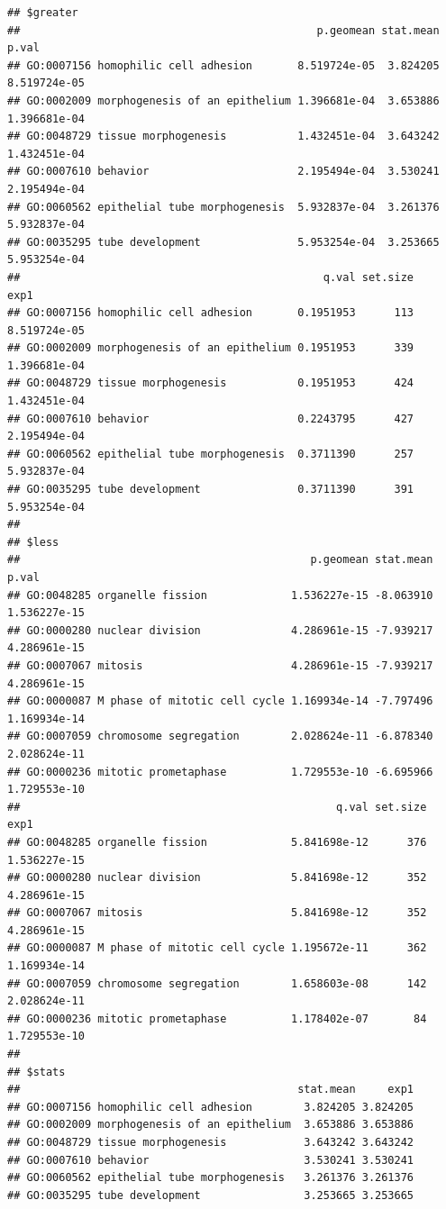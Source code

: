 \documentclass[
]{article}
\begin{document}
\begin{verbatim}
## $greater
##                                              p.geomean stat.mean        p.val
## GO:0007156 homophilic cell adhesion       8.519724e-05  3.824205 8.519724e-05
## GO:0002009 morphogenesis of an epithelium 1.396681e-04  3.653886 1.396681e-04
## GO:0048729 tissue morphogenesis           1.432451e-04  3.643242 1.432451e-04
## GO:0007610 behavior                       2.195494e-04  3.530241 2.195494e-04
## GO:0060562 epithelial tube morphogenesis  5.932837e-04  3.261376 5.932837e-04
## GO:0035295 tube development               5.953254e-04  3.253665 5.953254e-04
##                                               q.val set.size         exp1
## GO:0007156 homophilic cell adhesion       0.1951953      113 8.519724e-05
## GO:0002009 morphogenesis of an epithelium 0.1951953      339 1.396681e-04
## GO:0048729 tissue morphogenesis           0.1951953      424 1.432451e-04
## GO:0007610 behavior                       0.2243795      427 2.195494e-04
## GO:0060562 epithelial tube morphogenesis  0.3711390      257 5.932837e-04
## GO:0035295 tube development               0.3711390      391 5.953254e-04
## 
## $less
##                                             p.geomean stat.mean        p.val
## GO:0048285 organelle fission             1.536227e-15 -8.063910 1.536227e-15
## GO:0000280 nuclear division              4.286961e-15 -7.939217 4.286961e-15
## GO:0007067 mitosis                       4.286961e-15 -7.939217 4.286961e-15
## GO:0000087 M phase of mitotic cell cycle 1.169934e-14 -7.797496 1.169934e-14
## GO:0007059 chromosome segregation        2.028624e-11 -6.878340 2.028624e-11
## GO:0000236 mitotic prometaphase          1.729553e-10 -6.695966 1.729553e-10
##                                                 q.val set.size         exp1
## GO:0048285 organelle fission             5.841698e-12      376 1.536227e-15
## GO:0000280 nuclear division              5.841698e-12      352 4.286961e-15
## GO:0007067 mitosis                       5.841698e-12      352 4.286961e-15
## GO:0000087 M phase of mitotic cell cycle 1.195672e-11      362 1.169934e-14
## GO:0007059 chromosome segregation        1.658603e-08      142 2.028624e-11
## GO:0000236 mitotic prometaphase          1.178402e-07       84 1.729553e-10
## 
## $stats
##                                           stat.mean     exp1
## GO:0007156 homophilic cell adhesion        3.824205 3.824205
## GO:0002009 morphogenesis of an epithelium  3.653886 3.653886
## GO:0048729 tissue morphogenesis            3.643242 3.643242
## GO:0007610 behavior                        3.530241 3.530241
## GO:0060562 epithelial tube morphogenesis   3.261376 3.261376
## GO:0035295 tube development                3.253665 3.253665
\end{verbatim}
\end{document}
